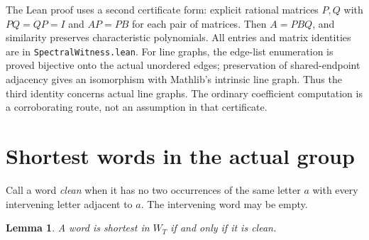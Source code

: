 \documentclass[11pt]{article}
\newtheorem{lemma}{Lemma}
\begin{document}
The Lean proof uses a second certificate form: explicit rational matrices \(P,Q\) with \(PQ=QP=I\) and \(AP=PB\) for each pair of matrices. Then \(A=PBQ\), and similarity preserves characteristic polynomials. All entries and matrix identities are in \texttt{SpectralWitness.lean}. For line graphs, the edge-list enumeration is proved bijective onto the actual unordered edges; preservation of shared-endpoint adjacency gives an isomorphism with Mathlib's intrinsic line graph. Thus the third identity concerns actual line graphs. The ordinary coefficient computation is a corroborating route, not an assumption in that certificate.
\newpage
\section{Shortest words in the actual group}
Call a word \emph{clean} when it has no two occurrences of the same letter \(a\) with every intervening letter adjacent to \(a\). The intervening word may be empty.
\begin{lemma}\label{normal}
A word is shortest in \(W_T\) if and only if it is clean.
\end{lemma}
\end{document}
